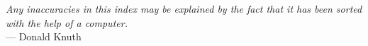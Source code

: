\renewcommand{\cftchapleader}{\cftdotfill{\cftdotsep}}

\tableofcontents

\vfill

\textit{\glqq{}Any inaccuracies in this index may be explained by the fact that it has been sorted with the help of a computer.\grqq{}}\\
\mbox{}\hfill --- Donald Knuth
